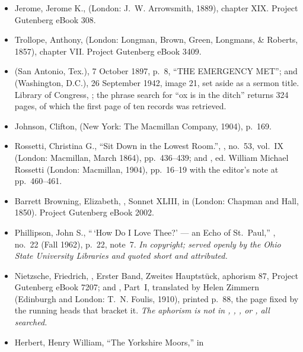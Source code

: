\begin{itemize}[leftmargin=1.2em, itemsep=0.15em]
\item Jerome, Jerome K., 
(London: J.~W. Arrowsmith, 1889), chapter XIX. Project Gutenberg eBook 308.
\item Trollope, Anthony,  (London: Longman, Brown,
Green, Longmans, \& Roberts, 1857), chapter VII. Project Gutenberg eBook 3409.
\item {} (San Antonio, Tex.), 7 October 1897, p.~8,
``THE EMERGENCY MET''; and  (Washington, D.C.), 26 September
1942, image 21, set aside as a sermon title. Library of Congress,
; the phrase search for ``ox is in the ditch'' returns
324 pages, of which the first page of ten records was retrieved.
\item Johnson, Clifton,  (New York: The
Macmillan Company, 1904), p.~169.
\item Rossetti, Christina G., ``Sit Down in the Lowest Room.'',
, no.~53, vol.~IX (London: Macmillan, March 1864),
pp.~436--439; and , ed.
William Michael Rossetti (London: Macmillan, 1904), pp.~16--19 with the editor's
note at pp.~460--461.
\item Barrett Browning, Elizabeth, , Sonnet
XLIII, in  (London: Chapman and Hall, 1850). Project Gutenberg
eBook 2002.
\item Phillipson, John S., ``\,`How Do I Love Thee?' --- an Echo of St.~Paul,''
, no.~22 (Fall 1962), p.~22, note~7. \textit{In
copyright; served openly by the Ohio State University Libraries and quoted short
and attributed.}
\item Nietzsche, Friedrich, , Erster Band, Zweites Hauptstück, aphorism 87, Project Gutenberg
eBook 7207; and , Part~I,
translated by Helen Zimmern (Edinburgh and London: T.~N. Foulis, 1910), printed
p.~88, the page fixed by the running heads that bracket it. \textit{The aphorism
is not in , ,
,  or , all
searched.}
\item Herbert, Henry William, ``The Yorkshire Moors,'' in 
\end{itemize}
